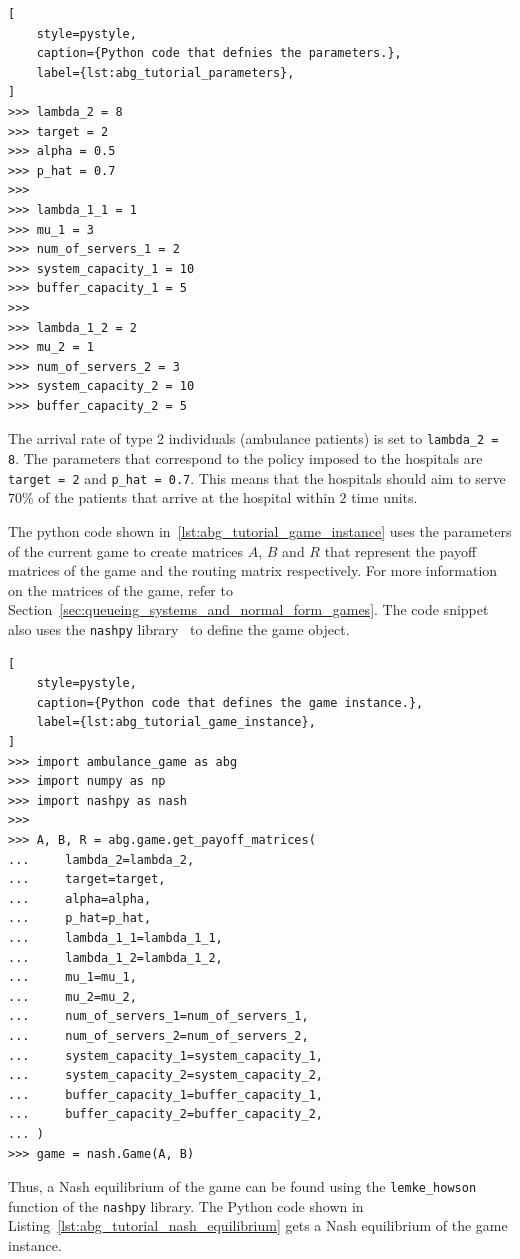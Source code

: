 \begin{lstlisting}[
    style=pystyle,
    caption={Python code that defnies the parameters.},
    label={lst:abg_tutorial_parameters},
]
>>> lambda_2 = 8
>>> target = 2
>>> alpha = 0.5
>>> p_hat = 0.7
>>>
>>> lambda_1_1 = 1
>>> mu_1 = 3
>>> num_of_servers_1 = 2
>>> system_capacity_1 = 10
>>> buffer_capacity_1 = 5
>>>
>>> lambda_1_2 = 2
>>> mu_2 = 1
>>> num_of_servers_2 = 3
>>> system_capacity_2 = 10
>>> buffer_capacity_2 = 5

\end{lstlisting}

The arrival rate of type 2 individuals (ambulance patients) is set to
\texttt{lambda\_2 = 8}.
The parameters that correspond to the policy imposed to the hospitals are
\texttt{target = 2} and \texttt{p\_hat = 0.7}.
This means that the hospitals should aim to serve \(70\%\) of the patients
that arrive at the hospital within \(2\) time units.

The python code shown in~\ref{lst:abg_tutorial_game_instance} uses the
parameters of the current game to create matrices \(A\), \(B\) and \(R\)
that represent the payoff matrices of the game and the routing matrix
respectively.
For more information on the matrices of the game, refer to
Section~\ref{sec:queueing_systems_and_normal_form_games}.
The code snippet also uses the \texttt{nashpy} library~\cite{nashpy} to
define the game object.

\begin{lstlisting}[
    style=pystyle,
    caption={Python code that defines the game instance.},
    label={lst:abg_tutorial_game_instance},
]
>>> import ambulance_game as abg
>>> import numpy as np
>>> import nashpy as nash
>>>
>>> A, B, R = abg.game.get_payoff_matrices(
...     lambda_2=lambda_2,
...     target=target,
...     alpha=alpha,
...     p_hat=p_hat,
...     lambda_1_1=lambda_1_1,
...     lambda_1_2=lambda_1_2,
...     mu_1=mu_1,
...     mu_2=mu_2,
...     num_of_servers_1=num_of_servers_1,
...     num_of_servers_2=num_of_servers_2,
...     system_capacity_1=system_capacity_1,
...     system_capacity_2=system_capacity_2,
...     buffer_capacity_1=buffer_capacity_1,
...     buffer_capacity_2=buffer_capacity_2,
... )
>>> game = nash.Game(A, B)

\end{lstlisting}

Thus, a Nash equilibrium of the game can be found using the
\texttt{lemke\_howson} function of the \texttt{nashpy} library.
The Python code shown in Listing~\ref{lst:abg_tutorial_nash_equilibrium}
gets a Nash equilibrium of the game instance.

